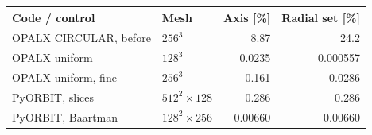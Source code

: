 \begin{tabular}{llrr}
\toprule
Code / control & Mesh & Axis [\%] & Radial set [\%] \\
\midrule
OPALX CIRCULAR, before & $256^3$ & 8.87 & 24.2 \\
OPALX uniform & $128^3$ & 0.0235 & 0.000557 \\
OPALX uniform, fine & $256^3$ & 0.161 & 0.0286 \\
PyORBIT, slices & $512^2\!\times\!128$ & 0.286 & 0.286 \\
PyORBIT, Baartman & $128^2\!\times\!256$ & 0.00660 & 0.00660 \\
\bottomrule
\end{tabular}
